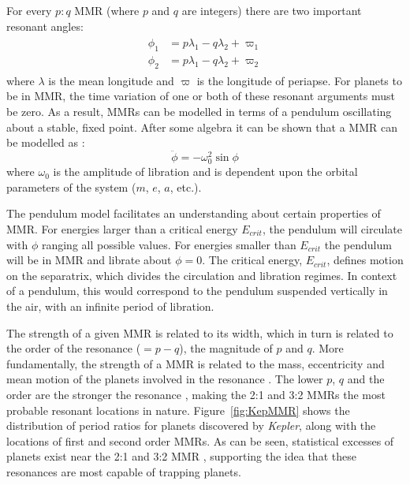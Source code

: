 \documentclass[12pt,letter]{aastex}
\newcommand{\kep}{{\it Kepler}\xspace}
\begin{document}
For every $p:q$ MMR (where $p$ and $q$ are integers) there are two important resonant angles:
\begin{align}
\begin{split}
\phi_1 &= p\lambda_1 - q\lambda_2 + \varpi_1 \\
\phi_2 &= p\lambda_1 - q\lambda_2 + \varpi_2 
\label{eq:MMR}
\end{split}
\end{align}
where $\lambda$ is the mean longitude and $\varpi$ is the longitude of periapse. 
For planets to be in MMR, the time variation of one or both of these resonant arguments must be zero.
As a result, MMRs can be modelled in terms of a pendulum oscillating about a stable, fixed point. 
After some algebra it can be shown that a MMR can be modelled as \citep{SSD1999}:
\begin{equation}
\ddot{\phi} = -\omega_0^2 \sin\phi
\label{eq:pendulum}
\end{equation}
where $\omega_0$ is the amplitude of libration and is dependent upon the orbital parameters of the system ($m$, $e$, $a$, etc.).

The pendulum model facilitates an understanding about certain properties of MMR. 
For energies larger than a critical energy $E_{crit}$, the pendulum will circulate with $\phi$ ranging all possible values. 
For energies smaller than $E_{crit}$ the pendulum will be in MMR and librate about $\phi = 0$.
The critical energy, $E_{crit}$, defines motion on the separatrix, which divides the circulation and libration regimes. 
In context of a pendulum, this would correspond to the pendulum suspended vertically in the air, with an infinite period of libration. 

The strength of a given MMR is related to its width, which in turn is related to the order of the resonance ($= p - q$),  the magnitude of $p$ and $q$\citep{SSD1999}. 
More fundamentally, the strength of a MMR is related to the mass, eccentricity and mean motion of the planets involved in the resonance \citep{SSD1999}.
The lower $p$, $q$ and the order are the stronger the resonance \citep{SSD1999}, making the 2:1 and 3:2 MMRs the most probable resonant locations in nature. 
Figure~\ref{fig:KepMMR} shows the distribution of period ratios for planets discovered by \kep, along with the locations of first and second order MMRs. 
As can be seen, statistical excesses of planets exist near the 2:1 and 3:2 MMR \citep{Lissauer2011,Fabrycky2014,Steffen2015}, supporting the idea that these resonances are most capable of trapping planets.
\end{document}

